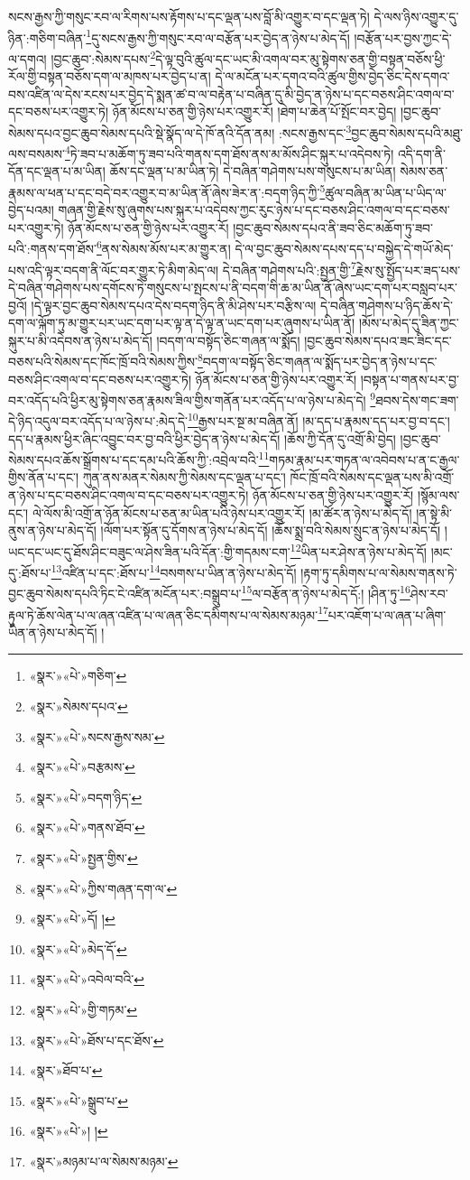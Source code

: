 སངས་རྒྱས་ཀྱི་གསུང་རབ་ལ་རིགས་པས་རྟོགས་པ་དང་ལྡན་པས་བློ་མི་འགྱུར་བ་དང་ལྡན་ཏེ། དེ་ལས་ཉིས་འགྱུར་དུ་ཉིན་:གཅིག་བཞིན་\footnote{«སྣར་»«པེ་»གཅིག་}དུ་སངས་རྒྱས་ཀྱི་གསུང་རབ་ལ་བརྩོན་པར་བྱེད་ན་ཉེས་པ་མེད་དོ། །བརྩོན་པར་བྱས་ཀྱང་དེ་ལ་དགའ། །བྱང་ཆུབ་:སེམས་དཔས་\footnote{«སྣར་»སེམས་དཔའ་}དེ་ལྟ་བུའི་ཚུལ་དང་ཡང་མི་འགལ་བར་མུ་སྟེགས་ཅན་གྱི་བསྟན་བཅོས་ཕྱི་རོལ་གྱི་བསྟན་བཅོས་དག་ལ་མཁས་པར་བྱེད་པ་ན། དེ་ལ་མངོན་པར་དགའ་བའི་ཚུལ་གྱིས་བྱེད་ཅིང་དེས་དགའ་བས་འཛིན་ལ་དེས་རངས་པར་བྱེད་དེ་སྨན་ཚ་བ་ལ་བརྟེན་པ་བཞིན་དུ་མི་བྱེད་ན་ཉེས་པ་དང་བཅས་ཤིང་འགལ་བ་དང་བཅས་པར་འགྱུར་ཏེ། ཉོན་མོངས་པ་ཅན་གྱི་ཉེས་པར་འགྱུར་རོ། །ཐེག་པ་ཆེན་པོ་སྤོང་བར་བྱེད། །བྱང་ཆུབ་སེམས་དཔའ་བྱང་ཆུབ་སེམས་དཔའི་སྡེ་སྣོད་ལ་དེ་ཁོ་ནའི་དོན་ནམ། :སངས་རྒྱས་དང་\footnote{«སྣར་»«པེ་»སངས་རྒྱས་སམ་}བྱང་ཆུབ་སེམས་དཔའི་མཐུ་ལས་བསམས་\footnote{«སྣར་»«པེ་»བརྩམས་}ཏེ་ཟབ་པ་མཆོག་ཏུ་ཟབ་པའི་གནས་དག་ཐོས་ནས་མ་མོས་ཤིང་སྐུར་པ་འདེབས་ཏེ། འདི་དག་ནི་དོན་དང་ལྡན་པ་མ་ཡིན། ཆོས་དང་ལྡན་པ་མ་ཡིན་ཏེ། དེ་བཞིན་གཤེགས་པས་གསུངས་པ་མ་ཡིན། སེམས་ཅན་རྣམས་ལ་ཕན་པ་དང་བདེ་བར་འགྱུར་བ་མ་ཡིན་ནོ་ཞེས་ཟེར་ན་:བདག་ཉིད་ཀྱི་\footnote{«སྣར་»«པེ་»བདག་ཉིད་}ཚུལ་བཞིན་མ་ཡིན་པ་ཡིད་ལ་བྱེད་པའམ། གཞན་གྱི་རྗེས་སུ་ཞུགས་པས་སྐུར་པ་འདེབས་ཀྱང་རུང་ཉེས་པ་དང་བཅས་ཤིང་འགལ་བ་དང་བཅས་པར་འགྱུར་ཏེ། ཉོན་མོངས་པ་ཅན་གྱི་ཉེས་པར་འགྱུར་རོ། །བྱང་ཆུབ་སེམས་དཔའ་ནི་ཟབ་ཅིང་མཆོག་ཏུ་ཟབ་པའི་:གནས་དག་ཐོས་\footnote{«སྣར་»«པེ་»གནས་ཐོབ་}ནས་སེམས་མོས་པར་མ་གྱུར་ན། དེ་ལ་བྱང་ཆུབ་སེམས་དཔས་དད་པ་བསྐྱེད་དེ་གཡོ་མེད་པས་འདི་ལྟར་བདག་ནི་ལོང་བར་གྱུར་ཏེ་མིག་མེད་ལ། དེ་བཞིན་གཤེགས་པའི་:སྤྱན་གྱི་\footnote{«སྣར་»«པེ་»སྤྱན་གྱིས་}རྗེས་སུ་སྤྱོད་པར་ཟད་པས་དེ་བཞིན་གཤེགས་པས་དགོངས་ཏེ་གསུངས་པ་སྤངས་པ་ནི་བདག་གི་ཆ་མ་ཡིན་ནོ་ཞེས་ཡང་དག་པར་བསླབ་པར་བྱའོ། །དེ་ལྟར་བྱང་ཆུབ་སེམས་དཔའ་དེས་བདག་ཉིད་ནི་མི་ཤེས་པར་བརྩིས་ལ། དེ་བཞིན་གཤེགས་པ་ཉིད་ཆོས་དེ་དག་ལ་ལྐོག་ཏུ་མ་གྱུར་པར་ཡང་དག་པར་ལྟ་ན་དེ་ལྟ་ན་ཡང་དག་པར་ཞུགས་པ་ཡིན་ནོ། །མོས་པ་མེད་དུ་ཟིན་ཀྱང་སྐུར་པ་མི་འདེབས་ན་ཉེས་པ་མེད་དོ། །བདག་ལ་བསྟོད་ཅིང་གཞན་ལ་སྨོད། །བྱང་ཆུབ་སེམས་དཔའ་ཟང་ཟིང་དང་བཅས་པའི་སེམས་དང་ཁོང་ཁྲོ་བའི་སེམས་ཀྱིས་\footnote{«སྣར་»«པེ་»ཀྱིས་གཞན་དག་ལ་}བདག་ལ་བསྟོད་ཅིང་གཞན་ལ་སྨོད་པར་བྱེད་ན་ཉེས་པ་དང་བཅས་ཤིང་འགལ་བ་དང་བཅས་པར་འགྱུར་ཏེ། ཉོན་མོངས་པ་ཅན་གྱི་ཉེས་པར་འགྱུར་རོ། །བསྟན་པ་གནས་པར་བྱ་བར་འདོད་པའི་ཕྱིར་མུ་སྟེགས་ཅན་རྣམས་ཟིལ་གྱིས་གནོན་པར་འདོད་པ་ལ་ཉེས་པ་མེད་དེ། \footnote{«སྣར་»«པེ་»དོ། ། }ཐབས་དེས་གང་ཟག་དེ་ཉིད་འདུལ་བར་འདོད་པ་ལ་ཉེས་པ་:མེད་དེ་\footnote{«སྣར་»«པེ་»མེད་དོ་}རྒྱས་པར་སྔ་མ་བཞིན་ནོ། །མ་དད་པ་རྣམས་དད་པར་བྱ་བ་དང་། དད་པ་རྣམས་ཕྱིར་ཞིང་འབྱུང་བར་བྱ་བའི་ཕྱིར་བྱེད་ན་ཉེས་པ་མེད་དོ། །ཆོས་ཀྱི་དོན་དུ་འགྲོ་མི་བྱེད། །བྱང་ཆུབ་སེམས་དཔའ་ཆོས་སྒྲོགས་པ་དང་དམ་པའི་ཆོས་ཀྱི་:འབྲེལ་བའི་\footnote{«སྣར་»«པེ་»འབེལ་བའི་}གཏམ་རྣམ་པར་གཏན་ལ་འབེབས་པ་ན་ང་རྒྱལ་གྱིས་ནོན་པ་དང་། ཀུན་ནས་མནར་སེམས་ཀྱི་སེམས་དང་ལྡན་པ་དང་། ཁོང་ཁྲོ་བའི་སེམས་དང་ལྡན་པས་མི་འགྲོ་ན་ཉེས་པ་དང་བཅས་ཤིང་འགལ་བ་དང་བཅས་པར་འགྱུར་ཏེ། ཉོན་མོངས་པ་ཅན་གྱི་ཉེས་པར་འགྱུར་རོ། །སྙོམ་ལས་དང་། ལེ་ལོས་མི་འགྲོ་ན་ཉོན་མོངས་པ་ཅན་མ་ཡིན་པའི་ཉེས་པར་འགྱུར་རོ། །མ་ཚོར་ན་ཉེས་པ་མེད་དོ། །ན་སྟེ་མི་ནུས་ན་ཉེས་པ་མེད་དོ། །ལོག་པར་སྟོན་དུ་དོགས་ན་ཉེས་པ་མེད་དོ། །ཆོས་སྨྲ་བའི་སེམས་སྲུང་ན་ཉེས་པ་མེད་དོ། །ཡང་དང་ཡང་དུ་ཐོས་ཤིང་བཟུང་ལ་ཤེས་ཟིན་པའི་དོན་:གྱི་གདམས་ངག་\footnote{«སྣར་»«པེ་»གྱི་གཏམ་}ཡིན་པར་ཤེས་ན་ཉེས་པ་མེད་དོ། །མང་དུ་:ཐོས་པ་\footnote{«སྣར་»«པེ་»ཐོས་པ་དང་ཐོས་}འཛིན་པ་དང་:ཐོས་པ་\footnote{«སྣར་»ཐོབ་པ་}བསགས་པ་ཡིན་ན་ཉེས་པ་མེད་དོ། །རྟག་ཏུ་དམིགས་པ་ལ་སེམས་གནས་ཏེ་བྱང་ཆུབ་སེམས་དཔའི་ཏིང་ངེ་འཛིན་མངོན་པར་:བསྒྲུབ་པ་\footnote{«སྣར་»«པེ་»སྒྲུབ་པ་}ལ་བརྩོན་ན་ཉེས་པ་མེད་དོ:། །ཤིན་ཏུ་\footnote{«སྣར་»«པེ་»། །}ཤེས་རབ་རྟུལ་ཏེ་ཆོས་ལེན་པ་ལ་ཞན་འཛིན་པ་ལ་ཞན་ཅིང་དམིགས་པ་ལ་སེམས་མཉམ་\footnote{«སྣར་»མཉམ་པ་ལ་སེམས་མཉམ་}པར་འཇོག་པ་ལ་ཞན་པ་ཞིག་ཡིན་ན་ཉེས་པ་མེད་དོ། །
